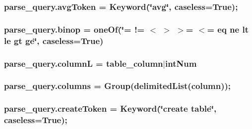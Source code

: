 \subsubsection[{\texorpdfstring{avg\+Token}{avgToken}}]{\setlength{\rightskip}{0pt plus 5cm}parse\+\_\+query.\+avg\+Token = Keyword(\char`\"{}avg\char`\"{}, caseless=True);}\hypertarget{namespaceparse__query_ac13d5a3fbab8872f67fb655514b59e1b}{}\label{namespaceparse__query_ac13d5a3fbab8872f67fb655514b59e1b}
\subsubsection[{\texorpdfstring{binop}{binop}}]{\setlength{\rightskip}{0pt plus 5cm}parse\+\_\+query.\+binop = one\+Of(\char`\"{}= != $<$ $>$ $>$= $<$= eq ne lt le gt ge\char`\"{}, caseless=True)}\hypertarget{namespaceparse__query_ab1003cd5e59f126e1e81f9b296c3e0ca}{}\label{namespaceparse__query_ab1003cd5e59f126e1e81f9b296c3e0ca}
\subsubsection[{\texorpdfstring{columnL}{columnL}}]{\setlength{\rightskip}{0pt plus 5cm}parse\+\_\+query.\+columnL = {\bf table\+\_\+column}$\vert${\bf int\+Num}}\hypertarget{namespaceparse__query_a654eaf38e9ab6f5f0e89bb4f2a4a9107}{}\label{namespaceparse__query_a654eaf38e9ab6f5f0e89bb4f2a4a9107}
\subsubsection[{\texorpdfstring{columns}{columns}}]{\setlength{\rightskip}{0pt plus 5cm}parse\+\_\+query.\+columns = Group(delimited\+List(column));}\hypertarget{namespaceparse__query_aba0ec1a15dd6eeaf692596690d6256ed}{}\label{namespaceparse__query_aba0ec1a15dd6eeaf692596690d6256ed}
\subsubsection[{\texorpdfstring{create\+Token}{createToken}}]{\setlength{\rightskip}{0pt plus 5cm}parse\+\_\+query.\+create\+Token = Keyword(\char`\"{}create {\bf table}\char`\"{}, caseless=True);}\hypertarget{namespaceparse__query_a5cd001d7c494bf0c5c026c9b14eacfca}{}\label{namespaceparse__query_a5cd001d7c494bf0c5c026c9b14eacfca}
